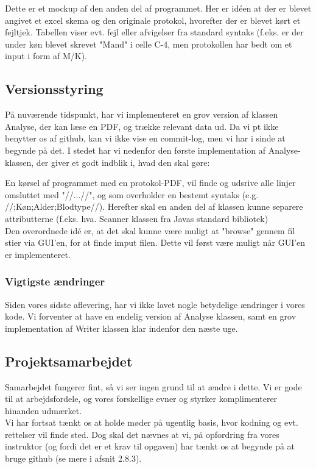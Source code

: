 \documentclass[11pt]{article}
\begin{document}
Dette er et mockup af den anden del af programmet. Her er idéen at der er blevet angivet et excel skema og den originale protokol, hvorefter der er blevet kørt et fejltjek. Tabellen viser evt. fejl eller afvigelser fra standard syntaks (f.eks. er der under køn blevet skrevet "Mand" i celle C-4, men protokollen har bedt om et input i form af M/K).
\pagebreak
\subsection{Versionsstyring}
På nuværende tidspunkt, har vi implementeret en grov version af klassen Analyse, der kan læse en PDF, og trække relevant data ud.
Da vi pt ikke benytter os af github, kan vi ikke vise en commit-log, men vi har i sinde at begynde på det. I stedet har vi nedenfor den første implementation af Analyse-klassen, der giver et godt indblik i, hvad den skal gøre:



En kørsel af programmet med en protokol-PDF, vil finde og udsrive alle linjer omsluttet med "//...//", og som overholder en bestemt syntaks (e.g. //;Køn;Alder;Blodtype//). Herefter skal en anden del af klassen kunne separere attributterne (f.eks. hva. Scanner klassen fra Javas standard bibliotek) \\Den overordnede idé er, at det skal kunne være muligt at "browse" gennem fil stier via GUI'en, for at finde imput filen. Dette vil først være muligt når GUI'en er implementeret.

\subsubsection{Vigtigste ændringer}
Siden vores sidste aflevering, har vi ikke lavet nogle betydelige ændringer i vores kode. Vi forventer at have en endelig version af Analyse klassen, samt en grov implementation af Writer klassen klar indenfor den næste uge.
\subsection{Projektsamarbejdet}
Samarbejdet fungerer fint, så vi ser ingen grund til at ændre i dette. Vi er gode til at arbejdsfordele, og vores forskellige evner og styrker komplimenterer hinanden udmærket.\\
Vi har fortsat tænkt os at holde møder på ugentlig basis, hvor kodning og evt. rettelser vil finde sted. Dog skal det nævnes at vi, på opfordring fra vores instruktor (og fordi det er et krav til opgaven) har tænkt os at begynde på at bruge github (se mere i afsnit 2.8.3).\\
\end{document}
